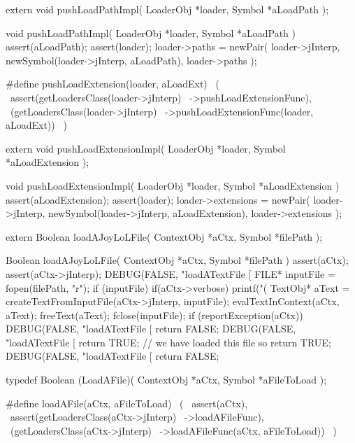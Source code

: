 \startCHeader
extern void pushLoadPathImpl(
  LoaderObj *loader,
  Symbol    *aLoadPath
);
\stopCHeader
{}

\startCCode
void pushLoadPathImpl(
  LoaderObj *loader,
  Symbol    *aLoadPath
) {
  assert(aLoadPath);
  assert(loader);
  loader->paths =
    newPair(
      loader->jInterp,
      newSymbol(loader->jInterp, aLoadPath),
      loader->paths
    );
}
\stopCCode

\startCHeader
#define pushLoadExtension(loader, aLoadExt)       \
  (                                               \
    assert(getLoadersClass(loader->jInterp)       \
      ->pushLoadExtensionFunc),                   \
    (getLoadersClass(loader->jInterp)             \
      ->pushLoadExtensionFunc(loader, aLoadExt))  \
  )
\stopCHeader

\setCHeaderStream{private}
\startCHeader
extern void pushLoadExtensionImpl(
  LoaderObj *loader,
  Symbol    *aLoadExtension
);
\stopCHeader
{}

\startCCode
void pushLoadExtensionImpl(
  LoaderObj *loader,
  Symbol    *aLoadExtension
) {
  assert(aLoadExtension);
  assert(loader);
  loader->extensions =
    newPair(
      loader->jInterp, 
      newSymbol(loader->jInterp, aLoadExtension),
      loader->extensions
    );
}
\stopCCode

\setCHeaderStream{private}
\startCHeader
extern Boolean loadAJoyLoLFile(
  ContextObj *aCtx,
  Symbol     *filePath
);
\stopCHeader
{}

\startCCode
Boolean loadAJoyLoLFile(
  ContextObj *aCtx,
  Symbol     *filePath
) {
  assert(aCtx);
  assert(aCtx->jInterp);
  DEBUG(FALSE, "loadATextFile [%
  FILE* inputFile = fopen(filePath, "r");
  if (inputFile) {
    if(aCtx->verbose) printf("(%
    TextObj* aText =
      createTextFromInputFile(aCtx->jInterp, inputFile);
    evalTextInContext(aCtx, aText);
    freeText(aText);
    fclose(inputFile);
    if (reportException(aCtx)) {
      DEBUG(FALSE, "loadATextFile [%
      return FALSE;
    }
    DEBUG(FALSE, "loadATextFile [%
    return TRUE; // we have loaded this file so return TRUE;
  }
  DEBUG(FALSE, "loadATextFile [%
  return FALSE;
}
\stopCCode

\startCHeader
typedef Boolean (LoadAFile)(
  ContextObj *aCtx,
  Symbol     *aFileToLoad
);

#define loadAFile(aCtx, aFileToLoad)       \
  (                                        \
    assert(aCtx),                          \
    assert(getLoadersClass(aCtx->jInterp)  \
      ->loadAFileFunc),                    \
    (getLoadersClass(aCtx->jInterp)        \
      ->loadAFileFunc(aCtx, aFileToLoad))  \
  )
\stopCHeader

